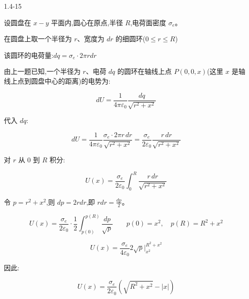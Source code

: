 \documentclass{article}
\begin{document}
1.4-15


设圆盘在 $ x-y $ 平面内,圆心在原点,半径 $ R $,电荷面密度 $ \sigma_e $。

在圆盘上取一个半径为 $ r $、宽度为 $ dr $ 的细圆环($ 0 \le r \le R $)

该圆环的电荷量:$dq = \sigma_e \cdot 2\pi r  dr$

由上一题已知,一个半径为 $ r $、电荷 $ dq $ 的圆环在轴线上点 $ P(0,0,x) $(这里 $ x $ 是轴线上点到圆盘中心的距离)的电势为:

$$dU = \frac{1}{4\pi\varepsilon_0} \frac{dq}{\sqrt{r^2 + x^2}}$$

代入 $ dq $:

$$dU = \frac{1}{4\pi\varepsilon_0} \frac{\sigma_e \cdot 2\pi r \, dr}{\sqrt{r^2 + x^2}}
= \frac{\sigma_e}{2\varepsilon_0} \frac{r \, dr}{\sqrt{r^2 + x^2}}$$

对 $ r $ 从 $ 0 $ 到 $ R $ 积分:

$$U(x) = \frac{\sigma_e}{2\varepsilon_0} \int_{0}^{R} \frac{r \, dr}{\sqrt{r^2 + x^2}}$$

令 $ p = r^2 + x^2 $,则 $ dp = 2rdr $,即 $ rdr = \frac{dp}{2} $。

$$U(x) = \frac{\sigma_e}{2\varepsilon_0} \cdot \frac12 \int_{p(0)}^{p(R)} \frac{dp}{\sqrt{p}}\qquad p(0) = x^2, \quad p(R) = R^2 + x^2$$

$$U(x) = \frac{\sigma_e}{4\varepsilon_0} 2\sqrt{p}| _{x^2}^{R^2 + x^2}$$

因此:

$$U(x) = \frac{\sigma_e}{2\varepsilon_0} \left( \sqrt{R^2 + x^2} - |x| \right)$$


\end{document}
